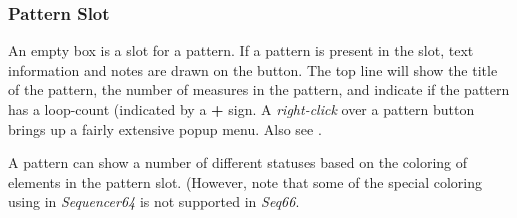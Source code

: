 \subsubsection{Pattern Slot}
\label{subsubsec:patterns_pattern_slot}

   An empty box is a slot for a pattern.
   If a pattern is present in the slot, text information and notes are drawn on
   the button.
   The top line will show
   the title of the pattern, the number of measures in the pattern, and
   indicate if the pattern has a loop-count (indicated by a
   \textbf{+} sign.
   A \textsl{right-click} over a pattern button brings up a fairly extensive
   popup menu.
   Also see .

%

   A pattern can show a number of different statuses based on the coloring
   of elements in the pattern slot.
   (However, note that some of the special coloring using in
   \textsl{Sequencer64} is not supported in \textsl{Seq66}.

